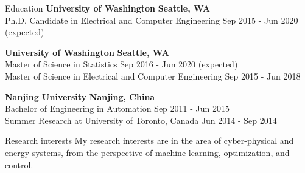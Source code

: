 \documentclass{resume} %
\begin{document}
    
    \begin{rSection}{Education}
	{\bf University of Washington} \hfill {\bf Seattle, WA} \\ 
	{Ph.D. Candidate in Electrical and Computer Engineering} \hfill {Sep 2015 - Jun 2020 (expected)}
	
	{\bf University of Washington} \hfill {\bf Seattle, WA} \\ 
	{Master of Science in Statistics} \hfill {Sep 2016 - Jun 2020 (expected)}\\
	{Master of Science in Electrical and Computer Engineering} \hfill {Sep 2015 - Jun 2018}
	
	{\bf Nanjing University} \hfill {\bf Nanjing, China} \\ 
	{Bachelor of Engineering in Automation} \hfill {Sep 2011 - Jun 2015}\\
	{Summer Research at University of Toronto, Canada} \hfill {Jun 2014 - Sep 2014}
\end{rSection}

\begin{rSection}{Research interests}
	My research interests are in the area of cyber-physical and energy systems, from the perspective of machine learning, optimization, and control.
\end{rSection}
\end{document}
